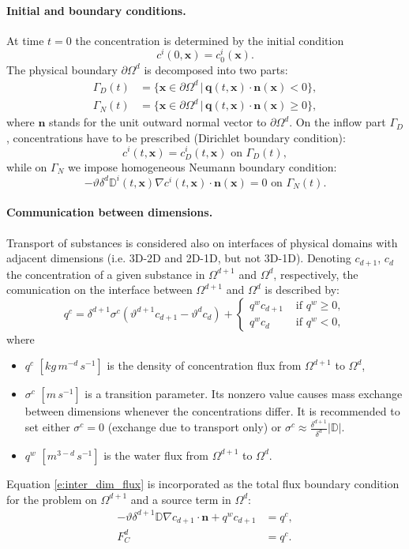 \documentclass[a4paper]{article}
\def\D{{\tn D}}
\def\vc#1{\mathbf{\boldsymbol{#1}}}     %
\def\th{\vartheta}
\def\tn#1{{\mathbb{#1}}}    %
\def\where{\,|\,}
\begin{document}
\paragraph{Initial and boundary conditions.}
At time $t=0$ the concentration is determined by the initial condition
$$ c^i(0,\vc x) = c^i_0(\vc x). $$
The physical boundary $\partial\Omega^d$ is decomposed into two parts:
\begin{align*}
\Gamma_D(t) &= \{\vc x\in \partial\Omega^d\where \vc q(t,\vc x)\cdot\vc n(\vc x)<0\},\\
\Gamma_N(t) &= \{\vc x\in \partial\Omega^d\where \vc q(t,\vc x)\cdot\vc n(\vc x)\ge 0\},
\end{align*}
where $\vc n$ stands for the unit outward normal vector to $\partial\Omega^d$.
On the inflow part $\Gamma_D$, concentrations have to be prescribed (Dirichlet boundary condition):
$$ c^i(t,\vc x) = c^i_D(t,\vc x) \mbox{ on }\Gamma_D(t), $$
while on $\Gamma_N$ we impose homogeneous Neumann boundary condition:
$$ -\th\delta^d\D^i(t,\vc x)\nabla c^i(t,\vc x)\cdot\vc n(\vc x) = 0 \mbox{ on }\Gamma_N(t). $$






\paragraph{Communication between dimensions.}
Transport of substances is considered also on interfaces of physical domains with adjacent dimensions (i.e. 3D-2D and 2D-1D, but not 3D-1D).
Denoting $c_{d+1}$, $c_d$ the concentration of a given substance in $\Omega^{d+1}$ and $\Omega^d$, respectively, the comunication on the interface between $\Omega^{d+1}$ and $\Omega^d$ is described by:
\begin{equation}
  \label{e:inter_dim_flux}
  q^c = \delta^{d+1}\sigma^c (\th^{d+1} c_{d+1} - \th^d c_d) + \begin{cases}q^w c_{d+1} & \mbox{ if }q^w\ge 0,\\q^w c_d & \mbox{ if }q^w<0,\end{cases}
\end{equation}
where
\begin{itemize}
\item $q^c$ $[kg\, m^{-d}\,s^{-1}]$ is the density of concentration flux from $\Omega^{d+1}$ to $\Omega^d$,
\item $\sigma^c$ $[m\,s^{-1}]$ is a transition parameter.
Its nonzero value causes mass exchange between dimensions whenever the concentrations differ.
It is recommended to set either $\sigma^c=0$ (exchange due to transport only) or $\sigma^c \approx\frac{\delta^{d+1}}{\delta^d}|\D|$.
\item $q^w$ $[m^{3-d}\,s^{-1}]$ is the water flux from $\Omega^{d+1}$ to $\Omega^d$.
\end{itemize}
Equation \eqref{e:inter_dim_flux} is incorporated as the total flux boundary condition for the problem on $\Omega^{d+1}$ and a source term in $\Omega^d$:
\begin{align}
-\th\delta^{d+1}\D\nabla c_{d+1}\cdot\vc n + q^w c_{d+1} &= q^c,\\
\label{e:FC}
F_C^d &= q^c.
\end{align}
\end{document}
